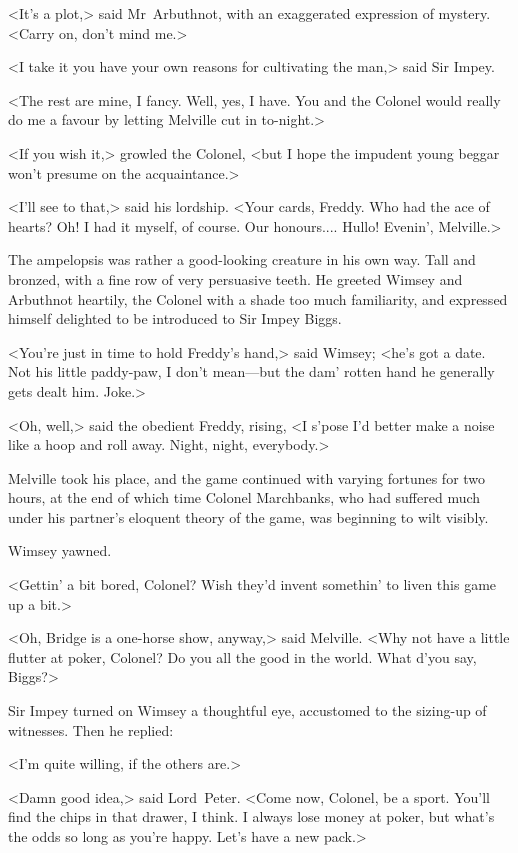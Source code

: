 <It's a plot,> said Mr~Arbuthnot, with an exaggerated expression of mystery. <Carry on, don't mind me.>

<I take it you have your own reasons for cultivating the man,> said Sir Impey.

<The rest are mine, I fancy. Well, yes, I have. You and the Colonel would really do me a favour by letting Melville cut in to-night.>

<If you wish it,> growled the Colonel, <but I hope the impudent young beggar won't presume on the acquaintance.>

<I'll see to that,> said his lordship. <Your cards, Freddy. Who had the ace of hearts? Oh! I had it myself, of course. Our honours.... Hullo! Evenin', Melville.>

The ampelopsis was rather a good-looking creature in his own way. Tall and bronzed, with a fine row of very persuasive teeth. He greeted Wimsey and Arbuthnot heartily, the Colonel with a shade too much familiarity, and expressed himself delighted to be introduced to Sir Impey Biggs.

<You're just in time to hold Freddy's hand,> said Wimsey; <he's got a date. Not his little paddy-paw, I don't mean—but the dam' rotten hand he generally gets dealt him. Joke.>

<Oh, well,> said the obedient Freddy, rising, <I s'pose I'd better make a noise like a hoop and roll away. Night, night, everybody.>

Melville took his place, and the game continued with varying fortunes for two hours, at the end of which time Colonel Marchbanks, who had suffered much under his partner's eloquent theory of the game, was beginning to wilt visibly.

Wimsey yawned.

<Gettin' a bit bored, Colonel? Wish they'd invent somethin' to liven this game up a bit.>

<Oh, Bridge is a one-horse show, anyway,> said Melville. <Why not have a little flutter at poker, Colonel? Do you all the good in the world. What d'you say, Biggs?>

Sir Impey turned on Wimsey a thoughtful eye, accustomed to the sizing-up of witnesses. Then he replied:

<I'm quite willing, if the others are.>

<Damn good idea,> said Lord~Peter. <Come now, Colonel, be a sport. You'll find the chips in that drawer, I think. I always lose money at poker, but what's the odds so long as you're happy. Let's have a new pack.>


